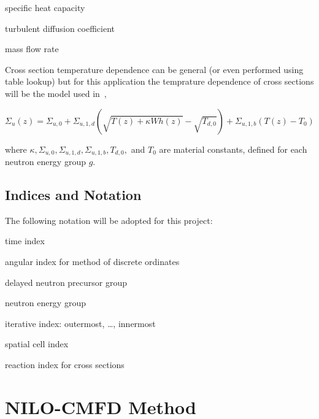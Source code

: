 \documentclass{proposal}
\begin{document}
\begin{description}[labelindent=1cm, labelwidth=1.2cm, before={\renewcommand\makelabel[1]{##1 $=$}}]
    \item[$c_p$] specific heat capacity
    \item[$k_b$] turbulent diffusion coefficient
    \item[$\dot{m}$] mass flow rate
\end{description}

Cross section temperature dependence can be general (or even performed using table lookup) but for this application the temprature dependence of cross sections will be the model used in~\cite{adamowicz2023nilo},

\begin{equation}\label{eq:temp-xs}
    \Sigma_u(z) = \Sigma_{u, 0} + \Sigma_{u, 1, d}\left( \sqrt{T(z) + \kappa W h(z)} - \sqrt{T_{d, 0}} \right)  + \Sigma_{u, 1, b}\left(T(z) -T_0 \right)
\end{equation}

where  $\kappa, \Sigma_{u, 0}, \Sigma_{u, 1, d}, \Sigma_{u, 1, b}, T_{d, 0},$ and $T_0$ are material constants, defined for each neutron energy group $g$.






\subsection{Indices and Notation}

The following notation will be adopted for this project:

\begin{description}[labelindent=1cm, labelwidth=1.2cm, before={\renewcommand\makelabel[1]{##1 $=$}}]
    \item[$j$] time index
    \item[$m$] angular index for method of discrete ordinates
    \item[$k$] delayed neutron precursor group
    \item[$g$] neutron energy group  
    \item[$n, s, l, r$] iterative index: outermost, \dots, innermost
    \item[$i$] spatial cell index\
    \item[$u$] reaction index for cross sections
\end{description}


\section{NILO-CMFD Method}\label{sec:NILO}
\end{document}
